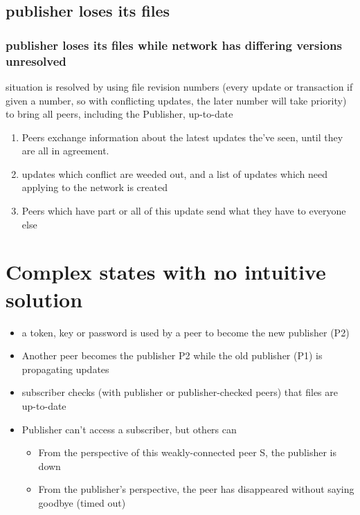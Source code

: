 \documentclass[12pt,a4paper,]{adreport}
\begin{document}
\subsection{publisher loses its files}\label{publisher-loses-its-files}

\subsubsection{publisher loses its files while network has differing
versions
unresolved}\label{publisher-loses-its-files-while-network-has-differing-versions-unresolved}

situation is resolved by using file revision numbers (every update or
transaction if given a number, so with conflicting updates, the later
number will take priority) to bring all peers, including the Publisher,
up-to-date

\begin{enumerate}
\def\labelenumi{\arabic{enumi}.}
\itemsep1pt\parskip0pt
\item
  Peers exchange information about the latest updates the've seen, until
  they are all in agreement.
\item
  updates which conflict are weeded out, and a list of updates which
  need applying to the network is created
\item
  Peers which have part or all of this update send what they have to
  everyone else
\end{enumerate}

\section{Complex states with no intuitive
solution}\label{complex-states-with-no-intuitive-solution}

\begin{itemize}
\itemsep1pt\parskip0pt
\item
  a token, key or password is used by a peer to become the new publisher
  (P2)
\item
  Another peer becomes the publisher P2 while the old publisher (P1) is
  propagating updates
\item
  subscriber checks (with publisher or publisher-checked peers) that
  files are up-to-date
\item
  Publisher can't access a subscriber, but others can

  \begin{itemize}
  \itemsep1pt\parskip0pt
  \item
    From the perspective of this weakly-connected peer S, the publisher
    is down
  \item
    From the publisher's perspective, the peer has disappeared without
    saying goodbye (timed out)
  \end{itemize}
\end{itemize}
\end{document}
